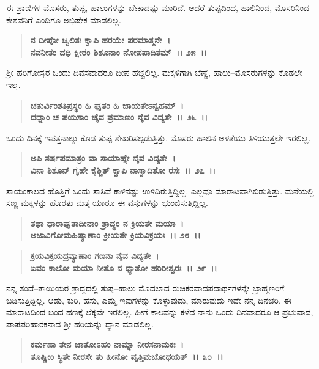 ಈ ಪ್ರಾಣಿಗಳ ಮೊಸರು, ತುಪ್ಪ, ಹಾಲುಗಳನ್ನು ಬೇಕಾದಷ್ಟು ಮಾರಿದೆ. ಆದರೆ ತುಪ್ಪದಿಂದ, ಹಾಲಿನಿಂದ, ಮೊಸರಿನಿಂದ ಕೇಶವನಿಗೆ ಎಂದಿಗೂ ಅಭಿಷೇಕ ಮಾಡಲಿಲ್ಲ.

\begin{verse}
\textbf{ನ ದೀಪೋ ಜ್ವಲಿತಃ ಕ್ವಾಪಿ ಹರಯೇ ಪರಮಾತ್ಮನೇ~।}\\\textbf{ನವನೀತಂ ದಧಿ ಕ್ಷೀರಂ ಶಿಶೂನಾಂ ನೋಪಪಾದಿತಮ್~।। ೨೫~।।}
\end{verse}

ಶ‍್ರೀ ಹರಿಗೋಸ್ಕರ ಒಂದು ದಿವಸವಾದರೂ ದೀಪ ಹಚ್ಚಲಿಲ್ಲ. ಮಕ್ಕಳಿಗಾಗಿ ಬೆಣ್ಣೆ, ಹಾಲು–ಮೊಸರುಗಳನ್ನು ಕೊಡಲೇ ಇಲ್ಲ.

\begin{verse}
\textbf{ಚತುರ್ವಿಂಶತಿಪ್ರಸ್ಥಂ ಹಿ ಘೃತಂ ಹಿ ಜಾಯತೇಽನ್ವಹಮ್~।}\\\textbf{ದಧ್ನಾಂ ಚ ಪಯಸಾಂ ಚೈವ ಪ್ರಮಾಣಂ ನೈವ ವಿದ್ಯತೇ~।। ೨೬~।।}
\end{verse}

ಒಂದು ದಿನಕ್ಕೆ ಇಪತ್ತನಾಲ್ಕು ಕೊಡ ತುಪ್ಪ ಶೇಖರಿಸಲ್ಪಡುತ್ತಿತ್ತು. ಮೊಸರು ಹಾಲಿನ ಅಳತೆಯು ತಿಳಿಯುತ್ತಲೇ ಇರಲಿಲ್ಲ.

\begin{verse}
\textbf{ಅಪಿ ಸರ್ಷಪಮಾತ್ರಂ ವಾ ಸಾಯಾಹ್ನೇ ನೈವ ವಿದ್ಯತೇ~।}\\\textbf{ವಿನಾ ಶಿಶೂನ್‌ ಗೃಹೇ ಕೈಶ್ಚಿತ್ ಕ್ವಾಪಿ ನಾಸ್ವಾದಿತೋ ರಸಃ~।। ೨೭~।।}
\end{verse}

ಸಾಯಂಕಾಲದ ಹೊತ್ತಿಗೆ ಒಂದು ಸಾಸಿವೆ ಕಾಳಿನಷ್ಟು ಉಳಿದಿರುತ್ತಿದ್ದಿಲ್ಲ. ಎಲ್ಲವೂ ಮಾರಾಟವಾಗಿಬಿಡುತ್ತಿತ್ತು. ಮನೆಯಲ್ಲಿ ಸಣ್ಣ ಮಕ್ಕಳನ್ನು ಹೊರತು ಮತ್ತೆ ಯಾರೂ ಈ ವಸ್ತುಗಳನ್ನು ಭುಂಜಿಸುತ್ತಿದ್ದಿಲ್ಲ.

\begin{verse}
\textbf{ತಥಾ ಧಾರಾಘೃತಾದೀನಾಂ ಶ್ರಾದ್ಧಂ ನ ಕ್ರಿಯತೇ ಮಯಾ~।}\\\textbf{ಅಜಾವಿಗೋಮಹಿಷ್ಯಾಣಾಂ ಕ್ರೀಯತೇ ಕ್ರಿಯವಿಕ್ರಯಃ~।। ೨೮~।। }
\end{verse}

\begin{verse}
\textbf{ಕ್ರಯವಿಕ್ರಯದ್ರವ್ಯಾಣಾಂ ಗಣನಾ ನೈವ ವಿದ್ಯತೇ~।}\\\textbf{ಏವಂ ಕಾಲೋ ಮಯಾ ನೀತೊ ನ ಧ್ಯಾತೋ ಹರಿರೀಶ್ವರಃ~।। ೨೯~।।}
\end{verse}

ನನ್ನ ತಂದೆ–ತಾಯಿಯರ ಶ್ರಾದ್ಧದಲ್ಲಿ ತುಪ್ಪ–ಹಾಲು ಮೊದಲಾದ ರುಚಿಕರವಾದ\break ಪದಾರ್ಥಗಳನ್ನೇ ಬ್ರಾಹ್ಮಣರಿಗೆ ಬಡಿಸುತ್ತಿದ್ದಿಲ್ಲ. ಆಡು, ಕುರಿ, ಹಸು, ಎಮ್ಮೆ ಇವುಗಳನ್ನು ಕೊಳ್ಳುವುದು, ಮಾರುವುದು ಇದೇ ನನ್ನ ದಿನಚರಿ. ಈ ಮಾರಾಟದಿಂದ ಬಂದ ಹಣಕ್ಕೆ ಲೆಕ್ಕವೇ ಇರಲಿಲ್ಲ. ಹೀಗೆ ಕಾಲವನ್ನು ಕಳೆದ ನಾನು ಒಂದು ದಿನವಾದರೂ ಆ ಪ್ರಭುವಾದ, ಪಾಪಪರಿಹಾರಕನಾದ ಶ‍್ರೀ ಹರಿಯನ್ನು ಧ್ಯಾನ ಮಾಡಲಿಲ್ಲ.

\begin{verse}
\textbf{ಕರ್ಮಣಾ ತೇನ ಜಾತೋಽಹಂ ನಾಮ್ನಾ ನೀರಸನಾಮಕಃ~।}\\\textbf{ತೂಷ್ಣೀಂ ಸ್ಥಿತೇ ನೀರಸೇ ತು ಹೀನೋ ವೃತ್ತಿಮಬೋಧಯತ್~।। ೩೦~।।}
\end{verse}

